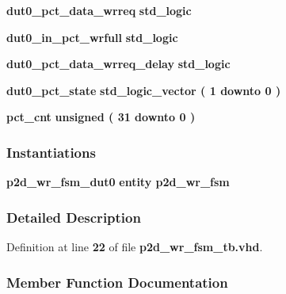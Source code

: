 \begin{DoxyCompactItemize}
\item 
{\bf dut0\+\_\+pct\+\_\+data\+\_\+wrreq} {\bfseries \textcolor{comment}{std\+\_\+logic}\textcolor{vhdlchar}{ }} 
\item 
{\bf dut0\+\_\+in\+\_\+pct\+\_\+wrfull} {\bfseries \textcolor{comment}{std\+\_\+logic}\textcolor{vhdlchar}{ }} 
\item 
{\bf dut0\+\_\+pct\+\_\+data\+\_\+wrreq\+\_\+delay} {\bfseries \textcolor{comment}{std\+\_\+logic}\textcolor{vhdlchar}{ }} 
\item 
{\bf dut0\+\_\+pct\+\_\+state} {\bfseries \textcolor{comment}{std\+\_\+logic\+\_\+vector}\textcolor{vhdlchar}{ }\textcolor{vhdlchar}{(}\textcolor{vhdlchar}{ }\textcolor{vhdlchar}{ } \textcolor{vhdldigit}{1} \textcolor{vhdlchar}{ }\textcolor{keywordflow}{downto}\textcolor{vhdlchar}{ }\textcolor{vhdlchar}{ } \textcolor{vhdldigit}{0} \textcolor{vhdlchar}{ }\textcolor{vhdlchar}{)}\textcolor{vhdlchar}{ }} 
\item 
{\bf pct\+\_\+cnt} {\bfseries \textcolor{comment}{unsigned}\textcolor{vhdlchar}{ }\textcolor{vhdlchar}{(}\textcolor{vhdlchar}{ }\textcolor{vhdlchar}{ } \textcolor{vhdldigit}{31} \textcolor{vhdlchar}{ }\textcolor{keywordflow}{downto}\textcolor{vhdlchar}{ }\textcolor{vhdlchar}{ } \textcolor{vhdldigit}{0} \textcolor{vhdlchar}{ }\textcolor{vhdlchar}{)}\textcolor{vhdlchar}{ }} 
\end{DoxyCompactItemize}
\subsubsection*{Instantiations}
 \begin{DoxyCompactItemize}
\item 
{\bf p2d\+\_\+wr\+\_\+fsm\+\_\+dut0}  {\bfseries entity p2d\+\_\+wr\+\_\+fsm}   
\end{DoxyCompactItemize}


\subsubsection{Detailed Description}


Definition at line {\bf 22} of file {\bf p2d\+\_\+wr\+\_\+fsm\+\_\+tb.\+vhd}.



\subsubsection{Member Function Documentation}
